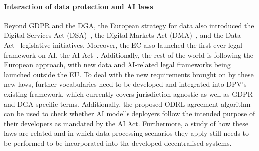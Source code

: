 \paragraph{Interaction of data protection and AI laws}
Beyond GDPR and the DGA, the European strategy for data also introduced the Digital Services Act (DSA)~\citeyearpar{noauthor_dsa_2022}, the Digital Markets Act (DMA)~\citeyearpar{noauthor_dma_2022}, and the Data Act~\citeyearpar{noauthor_dataact_2022} legislative initiatives.
Moreover, the EC also launched the first-ever legal framework on AI, the AI Act~\citeyearpar{noauthor_proposal_2021}.
Additionally, the rest of the world is following the European approach, with new data and AI-related legal frameworks being launched outside the EU.
To deal with the new requirements brought on by these new laws, further vocabularies need to be developed and integrated into DPV's existing framework, which currently covers jurisdiction-agnostic as well as GDPR and DGA-specific terms.
Additionally, the proposed ODRL agreement algorithm can be used to check whether AI model's deployers follow the intended purpose of their developers as mandated by the AI Act.
Furthermore, a study of how these laws are related and in which data processing scenarios they apply still needs to be performed to be incorporated into the developed decentralised systems.